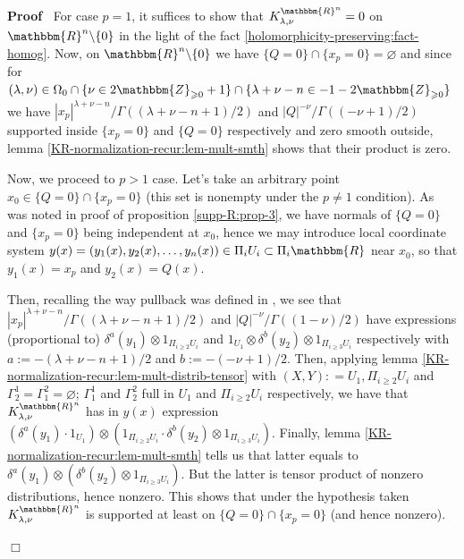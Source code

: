 \documentclass{article}
\newcommand{\assign}{:=}
\newcommand{\um}{-}
\newcommand{\upl}{+}
\newenvironment{proof}{\noindent\textbf{Proof\ }}{\hspace*{\fill}$\Box$\medskip}
\numberwithin{definition}{section}
\numberwithin{lemma}{section}
\numberwithin{proposition}{section}
{\theorembodyfont{\rmfamily}\newtheorem{remark}{Remark}
\numberwithin{remark}{section}
}
\begin{document}
\begin{proof}
  For case $p = 1$, it suffices to show that $K_{\lambda, \nu}^{\mathbbm{R}^n}
  = 0$ on $\mathbbm{R}^n \backslash \{ 0 \}$ in the light of the fact
  \ref{holomorphicity-preserving:fact-homog}. Now, on $\mathbbm{R}^n
  \backslash \{ 0 \}$ we have $\{ Q = 0 \} \cap \{ x_p = 0 \} = \varnothing$
  and since for $( \lambda, \nu) \in \Omega_0 \cap \{ \nu \in
  2\mathbbm{Z}_{\geqslant 0} + 1 \} \cap \{ \lambda + \nu - n \in - 1 -
  2\mathbbm{Z}_{\geqslant 0} \}$ we have $| x_p |^{\lambda + \nu - n} / \Gamma
  ( ( \lambda \upl \nu - n + 1) / 2)$ and $| Q |^{- \nu} / \Gamma ( ( \um \nu
  + 1) / 2)$ supported inside $\{ x_p = 0 \}$ and $\{ Q = 0 \}$ respectively
  and zero smooth outside, lemma \ref{KR-normalization-recur:lem-mult-smth}
  shows that their product is zero.
  
  Now, we proceed to $p > 1$ case. Let's take an arbitrary point $x_0 \in \{ Q
  = 0 \} \cap \{ x_p = 0 \}$ (this set is nonempty under the $p \neq 1$
  condition). As was noted in proof of proposition \ref{supp-R:prop-3}, we
  have normals of $\{ Q = 0 \}$ and $\{ x_p = 0 \}$ being independent at
  $x_0$, hence we may introduce local coordinate system $y ( x) = ( y_1 ( x),
  y_2 ( x), \ldots, y_n ( x)) \in \Pi_i U_i \subset \Pi_i \mathbbm{R}$ near
  $x_0$, so that $y_1 ( x) = x_p$ and $y_2 ( x) = Q ( x)$.
  
  Then, recalling the way pullback was defined in
  {\cite{hormander1983analysis}}, we see that $| x_p |^{\lambda + \nu - n} /
  \Gamma ( ( \lambda + \nu - n + 1) / 2)$ and $| Q |^{- \nu} / \Gamma ( ( 1 -
  \nu) / 2)$ have expressions (proportional to) $\delta^a ( y_1) \otimes
  1_{\Pi_{i \geqslant 2} U_i}$ and $1_{U_1} \otimes \delta^b ( y_2) \otimes
  1_{\Pi_{i \geqslant 3} U_i}$ respectively with $a \assign - ( \lambda + \nu
  - n + 1) / 2$ and $b \assign - ( - \nu + 1) / 2$. Then, applying lemma
  \ref{KR-normalization-recur:lem-mult-distrib-tensor} with $( X, Y) : = U_1,
  \Pi_{i \geqslant 2} U_i$ and $\Gamma_2^1 = \Gamma_1^2 = \varnothing$;
  $\Gamma^1_1$ and $\Gamma_2^2$ full in $U_1$ and $\Pi_{i \geqslant 2} U_i$
  respectively, we have that $K_{\lambda, \nu}^{\mathbbm{R}^n}$ has in $y (
  x)$ expression $( \delta^a ( y_1) \cdot 1_{U_1}) \otimes ( 1_{\Pi_{i
  \geqslant 2} U_i} \cdot \delta^b ( y_2) \otimes 1_{\Pi_{i \geqslant 3}
  U_i})$. Finally, lemma \ref{KR-normalization-recur:lem-mult-smth} tells us
  that latter equals to $\delta^a ( y_1) \otimes ( \delta^b ( y_2) \otimes
  1_{\Pi_{i \geqslant 3} U_i})$. But the latter is tensor product of nonzero
  distributions, hence nonzero. This shows that under the hypothesis taken
  $K_{\lambda, \nu}^{\mathbbm{R}^n}$ is supported at least on $\{ Q = 0 \}
  \cap \{ x_p = 0 \}$ (and hence nonzero).
  

\end{proof}
\end{document}
